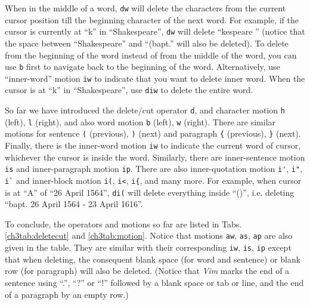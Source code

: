 When in the middle of a word, \verb|dw| will delete the characters from the current cursor position till the beginning character of the next word. For example, if the cursor is currently at ``k'' in ``Shakespeare'', \verb|dw| will delete ``kespeare '' (notice that the space between ``Shakespeare'' and ``(bapt.'' will also be deleted). To delete from the beginning of the word instead of from the middle of the word, you can use \verb|b| first to navigate back to the beginning of the word. Alternatively, use ``inner-word'' motion \verb|iw| to indicate that you want to delete inner word. When the cursor is at ``k'' in ``Shakespeare'', use \verb|diw| to delete the entire word.

So far we have introduced the delete/cut operator \verb|d|, and character motion \verb|h| (left), \verb|l| (right), and also word motion \verb|b| (left), \verb|w| (right). There are similar motions for sentence \verb|(| (previous), \verb|)| (next) and paragraph \verb|{| (previous), \verb|}| (next). Finally, there is the inner-word motion \verb|iw| to indicate the current word of cursor, whichever the cursor is inside the word. Similarly, there are inner-sentence motion \verb|is| and inner-paragraph motion \verb|ip|. There are also inner-quotation motion \verb|i'|, \verb|i"|, \verb|i`| and inner-block motion \verb|i(|, \verb|i<|, \verb|i{|, and many more. For example, when cursor is at ``A'' of ``26 April 1564'', \verb|di(| will delete everything inside ``()'', i.e. deleting ``bapt. 26 April 1564 - 23 April 1616''.

To conclude, the operators and motions so far are listed in Tabs. \ref{ch3tab:deletecut} and \ref{ch3tab:motion}. Notice that motions \verb|aw|, \verb|as|, \verb|ap| are also given in the table. They are similar with their corresponding \verb|iw|, \verb|is|, \verb|ip| except that when deleting, the consequent blank space (for word and sentence) or blank row (for paragraph) will also be deleted. (Notice that \textit{Vim} marks the end of a sentence using ``.'', ``?'' or ``!'' followed by a blank space or tab or line, and the end of a paragraph by an empty row.)

